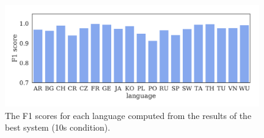 \documentclass[bsc,frontabs,twoside,singlespacing,parskip,deptreport]{infthesis}
\begin{document}
{{    \begin{figure}[h!t]
      \centering
      \includegraphics[width=11cm]{../img/f1-best.pdf}
      \vspace*{-1.2em}
      \caption{The F1 scores for each language computed from the results of the best system (10s condition).}
      \label{fig:f1-best-10s}
    \end{figure} 

}}
\end{document}
